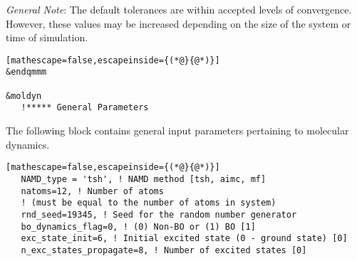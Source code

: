 \noindent \textit{General Note}: The default tolerances are within accepted levels of convergence.  However, these values may be increased depending on the size of the system or time of simulation.
\vspace{0.5cm}

\begin{lstlisting}[mathescape=false,escapeinside={(*@}{@*)}]
&endqmmm

&moldyn
   !***** General Parameters
\end{lstlisting}

\noindent The following block contains general input parameters pertaining to molecular dynamics.
\begin{lstlisting}[mathescape=false,escapeinside={(*@}{@*)}]
   NAMD_type = 'tsh', ! NAMD method [tsh, aimc, mf]
   natoms=12, ! Number of atoms 
   ! (must be equal to the number of atoms in system)
   rnd_seed=19345, ! Seed for the random number generator
   bo_dynamics_flag=0, ! (0) Non-BO or (1) BO [1]
   exc_state_init=6, ! Initial excited state (0 - ground state) [0]
   n_exc_states_propagate=8, ! Number of excited states [0]
\end{lstlisting}

